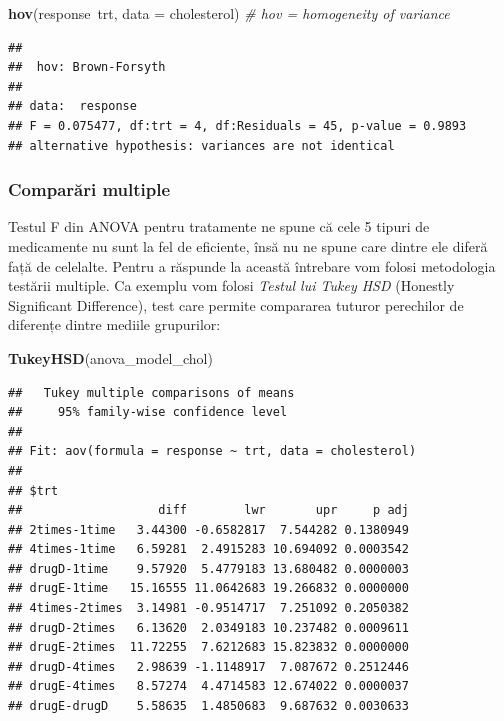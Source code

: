 \documentclass[]{article}
\newenvironment{Shaded}{\begin{snugshade}}{\end{snugshade}}
\newcommand{\KeywordTok}[1]{\textcolor[rgb]{0.13,0.29,0.53}{\textbf{{#1}}}}
\newcommand{\DataTypeTok}[1]{\textcolor[rgb]{0.13,0.29,0.53}{{#1}}}
\newcommand{\CommentTok}[1]{\textcolor[rgb]{0.56,0.35,0.01}{\textit{{#1}}}}
\newcommand{\NormalTok}[1]{{#1}}
\begin{document}
\begin{Shaded}
\begin{Highlighting}[]
\KeywordTok{hov}\NormalTok{(response~trt, }\DataTypeTok{data =} \NormalTok{cholesterol) }\CommentTok{# hov = homogeneity of variance}
\end{Highlighting}
\end{Shaded}

\begin{verbatim}
## 
##  hov: Brown-Forsyth
## 
## data:  response
## F = 0.075477, df:trt = 4, df:Residuals = 45, p-value = 0.9893
## alternative hypothesis: variances are not identical
\end{verbatim}

\subsubsection*{Comparări multiple}\label{comparari-multiple}

Testul F din ANOVA pentru tratamente ne spune că cele 5 tipuri de
medicamente nu sunt la fel de eficiente, însă nu ne spune care dintre
ele diferă față de celelalte. Pentru a răspunde la această întrebare vom
folosi metodologia testării multiple. Ca exemplu vom folosi \emph{Testul
lui Tukey HSD} (Honestly Significant Difference), test care permite
compararea tuturor perechilor de diferențe dintre mediile grupurilor:

\begin{Shaded}
\begin{Highlighting}[]
\KeywordTok{TukeyHSD}\NormalTok{(anova_model_chol)}
\end{Highlighting}
\end{Shaded}

\begin{verbatim}
##   Tukey multiple comparisons of means
##     95% family-wise confidence level
## 
## Fit: aov(formula = response ~ trt, data = cholesterol)
## 
## $trt
##                   diff        lwr       upr     p adj
## 2times-1time   3.44300 -0.6582817  7.544282 0.1380949
## 4times-1time   6.59281  2.4915283 10.694092 0.0003542
## drugD-1time    9.57920  5.4779183 13.680482 0.0000003
## drugE-1time   15.16555 11.0642683 19.266832 0.0000000
## 4times-2times  3.14981 -0.9514717  7.251092 0.2050382
## drugD-2times   6.13620  2.0349183 10.237482 0.0009611
## drugE-2times  11.72255  7.6212683 15.823832 0.0000000
## drugD-4times   2.98639 -1.1148917  7.087672 0.2512446
## drugE-4times   8.57274  4.4714583 12.674022 0.0000037
## drugE-drugD    5.58635  1.4850683  9.687632 0.0030633
\end{verbatim}
\end{document}
